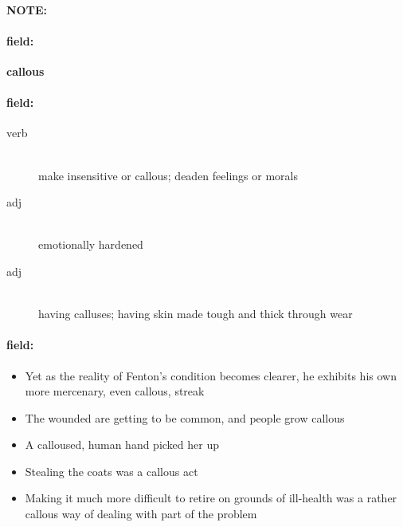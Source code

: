 \documentclass[12pt]{article}
\newenvironment{note}{\paragraph{NOTE:}}{}
\newenvironment{field}{\paragraph{field:}}{}
\begin{document}
\begin{note}
\begin{field}
\textbf{\large callous}
\end{field}


\begin{field}
\begin{description}
\item[verb] \hfill \\ 
make insensitive or callous; deaden feelings or morals

\item[adj] \hfill \\ 
emotionally hardened

\item[adj] \hfill \\ 
having calluses; having skin made tough and thick through wear

\end{description}
\end{field}

\begin{field}
\begin{itemize}
\item Yet as the reality of Fenton's condition becomes clearer, he exhibits his own more mercenary, even callous, streak
\item The wounded are getting to be common, and people grow callous
\item A calloused, human hand picked her up
\item Stealing the coats was a callous act
\item Making it much more difficult to retire on grounds of ill-health was a rather callous way of dealing with part of the problem
\end{itemize}
\end{field}
\end{note}
\end{document}
